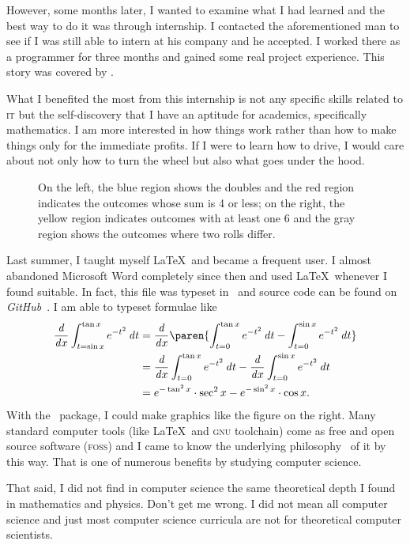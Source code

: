 	However, some months later, I wanted to examine what I had learned and the best
	way to do it was through internship. I contacted the aforementioned man to see
	if I was still able to intern at his company and he accepted. I worked there as
	a programmer for three months and gained some real project experience. This
	story was covered by .
	
	What I benefited the most from this internship is not any specific skills
	related to \textsc{it} but the self-discovery that I have an aptitude for
	academics, specifically mathematics. I am more interested in how things work
	rather than how to make things only for the immediate profits. If I were to
	learn how to drive, I would care about not only how to turn the wheel but also
	what goes under the hood.
	
	\begin{wrapfigure}[8]{r}[.6in]{.4\textwidth}
		\scalebox{.4}{ \lnum  }
		\caption{On the left, the blue region shows the doubles and the red region
			indicates the outcomes whose sum is 4 or less; on the right, the yellow region
			indicates outcomes with at least one 6 and the gray region shows the outcomes
			where two rolls differ.}
		\label{fig:CondProbEx}
	\end{wrapfigure}
	
	Last summer, I taught myself \LaTeX\ and became a frequent user. I almost
	abandoned Microsoft Word completely since then and used \LaTeX\ whenever I found
	suitable. In fact, this file was typeset in \LuaLaTeX\ and source code can be
	found on \textit{GitHub}~\cite{Readmission}. I am able to typeset formulae like
	\begin{align*}
	\dd x \int_{t=\sin x}^{\tan x} e^{-t^2} \dt
		&= \dd x \paren{\int_{t=0}^{\tan x} e^{-t^2} \dt -
			\int_{t=0}^{\sin x} e^{-t^2} \dt} \\
		&= \dd x \int_{t=0}^{\tan x} e^{-t^2} \dt
			- \dd x \int_{t=0}^{\sin x} e^{-t^2} \dt \\
		&= e^{-\tan^2 x} \cdot \sec^2 x - e^{-\sin^2 x} \cdot \cos x.
	\end{align*}
	With the \TikZ\ package, I could make graphics like the figure on the right.
	Many standard computer tools (like \LaTeX\ and \textsc{gnu} toolchain) come as
	free and open source software (\textsc{foss}) and I came to know the underlying
	philosophy~\cite{free-sw} of it by this way. That is one of numerous benefits
	by studying computer science.
	
	That said, I did not find in computer science the same theoretical depth I
	found in mathematics and physics. Don't get me wrong. I did not mean all
	computer science and just most computer science curricula are not for
	theoretical computer scientists.
	
